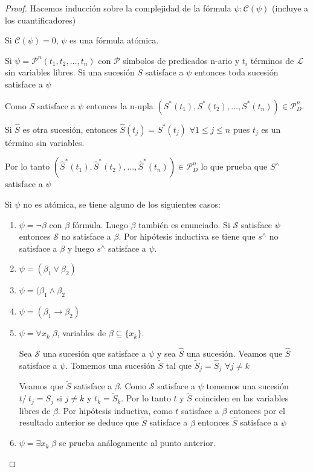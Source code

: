 \begin{proof}

Hacemos inducci\'on sobre la complejidad de la f\'ormula $\psi : \mathcal{C}(\psi)$ (incluye a los cuantificadores)

Si $\mathcal{C}(\psi) = 0$, $\psi$ es una f\'ormula at\'omica.

Si $\mathcal{\psi} = \mathcal{P}^n(t_1, t_2, \ldots, t_n)$ con $\mathcal{P}$ s\'imbolos de predicados n-ario y $t_i$ t\'erminos de $\mathcal{L}$ sin variables libres. Si una sucesi\'on $S$ satisface a $\psi$ entonces toda sucesi\'on satisface a $\psi$

Como $S$ satisface a $\psi$ entonces la n-upla $(S^{*}(t_1), S^{*}(t_2), \ldots, S^{*}(t_n)) \in \mathcal{P}^{n}_{D}$.

Si $\hat{S}$ es otra sucesi\'on, entonces $\hat{S}(t_j) = S^{*}(t_j)$ $\forall 1 \leq j \leq n$ pues $t_j$ es un t\'ermino sin variables.

Por lo tanto $(\hat{S}^{*}(t_1), \hat{S}^{*}(t_2), \ldots, \hat{S}^{*}(t_n)) \in \mathcal{P}^{n}_{D}$ lo que prueba que $S^\wedge$ satisface a $\psi$

Si $\psi$ no es at\'omica, se tiene alguno de los siguientes casos:

\begin{enumerate}
	\item $\psi = \neg \beta$ con $\beta$ f\'ormula. Luego $\beta$ tambi\'en es enunciado. Si $\mathcal{S}$ satisface $\psi$ entonces $\mathcal{S}$ no satisface a $\beta$. Por hip\'otesis inductiva se tiene que $s^\wedge$ no satisface a $\beta$ y luego $s^\wedge$ satisface a $\psi$.
	\item $\psi = (\beta_1 \lor \beta_2)$ %
	\item $\psi = (\beta_1 \land \beta_2$
	\item $\psi = (\beta_1 \rightarrow \beta_2)$
	\item $\psi = \forall x_k \; \beta$, variables de $\beta \subseteq \{ x_k\}$.
	
	Sea $\mathcal{S}$ una sucesi\'on que satisface a $\psi$ y sea $\hat{S}$ una sucesi\'on. Veamos que $\hat{S}$ satisface a $\psi$. Tomemos una sucesi\'on $\tilde{S}$ tal que $\tilde{S}_j = \hat{S}_j$ $\forall j \neq k$ 
	
	Veamos que $\tilde{S}$ satisface a $\beta$. Como $\mathcal{S}$ satisface a $\psi$ tomemos una sucesi\'on $t /\ t_j = S_j$ si $j \neq k$ y $t_k = \tilde{S}_{k}$. Por lo tanto $t$ y $\tilde{S}$ coinciden en las variables libres de $\beta$. Por hip\'otesis inductiva, como $t$ satisface a $\beta$ entonces por el resultado anterior se deduce que $\tilde{S}$ satisface a $\beta$ entonces $\hat{S}$ satisface a $\psi$
	\item $\psi = \exists x_k \; \beta$ se prueba an\'alogamente al punto anterior.	
\end{enumerate}

\end{proof}

